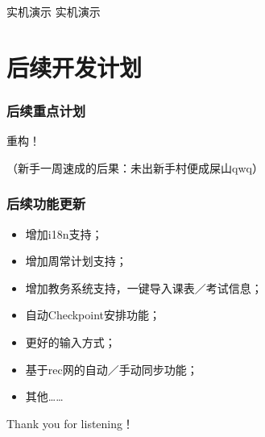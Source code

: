 \documentclass{beamer}
\begin{document}
    \begin{frame}{实机演示}
        \centering
        \Huge 实机演示
    \end{frame}

    \section{后续开发计划}

    \begin{frame}
        \sectionpage
    
        
    
    \end{frame}

    \begin{frame}
        \frametitle{后续重点计划}
        \vfill
        \begin{center}
            \begin{Huge}
                重构！
            \end{Huge}
            \vfill
            （新手一周速成的后果：未出新手村便成屎山qwq）
        \end{center}
    
    \end{frame}
	
	\begin{frame}
        \frametitle{后续功能更新}
        \vfill
        \begin{itemize}
            \item 增加i18n支持；\\\vfill
            \item 增加周常计划支持；\\\vfill
            \item 增加教务系统支持，一键导入课表／考试信息；\\\vfill
            \item 自动Checkpoint安排功能；\\\vfill
            \item 更好的输入方式；\\\vfill
            \item 基于rec网的自动／手动同步功能；\\\vfill
            \item 其他……
        \end{itemize}
    
    \end{frame}
	
	
	\begin{frame}
		\Huge{\centerline{Thank you for listening！}}
		\centering{$(*\slash\omega\backslash*)$}
	\end{frame}
	
\end{document}
